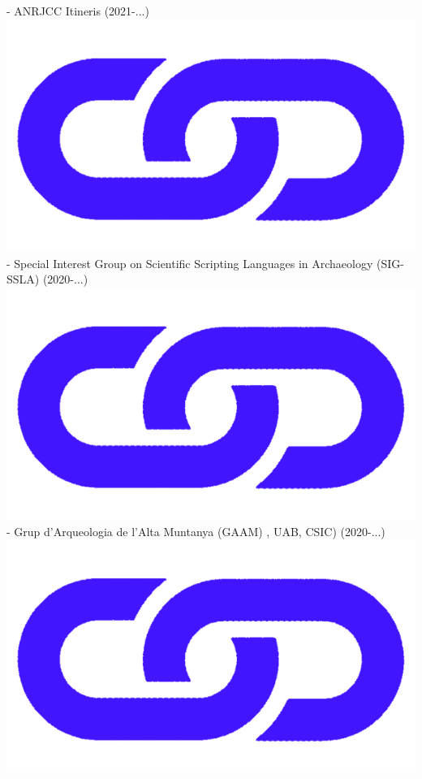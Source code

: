 \documentclass{article}
\begin{document}
- ANRJCC Itineris (2021-...) \href{https://anr.fr/Project-ANR-21-CE27-0010}{\includegraphics[scale=0.02]{link_darkblue.png}}\\ 
- Special Interest Group on Scientific Scripting Languages in Archaeology (SIG-SSLA) (2020-...) \href{https://sslarch.github.io/}{\includegraphics[scale=0.02]{link_darkblue.png}}\\ 
- Grup d'Arqueologia de l'Alta Muntanya (GAAM) , UAB, CSIC) (2020-...)\href{https://arqueologiademuntanya.wordpress.com/}{\includegraphics[scale=0.02]{link_darkblue.png}}\\ 
\end{document}

